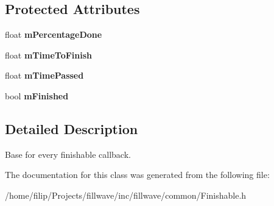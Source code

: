 \subsection*{Protected Attributes}
\begin{DoxyCompactItemize}
\item 
\hypertarget{classfillwave_1_1common_1_1Finishable_a6ff5cf040384c89ca596387efde649a7}{}float {\bfseries m\+Percentage\+Done}\label{classfillwave_1_1common_1_1Finishable_a6ff5cf040384c89ca596387efde649a7}

\item 
\hypertarget{classfillwave_1_1common_1_1Finishable_a3ae8d9913828e82d5762ebe88942c198}{}float {\bfseries m\+Time\+To\+Finish}\label{classfillwave_1_1common_1_1Finishable_a3ae8d9913828e82d5762ebe88942c198}

\item 
\hypertarget{classfillwave_1_1common_1_1Finishable_a7512122b86184a2d4f885816abbbbebc}{}float {\bfseries m\+Time\+Passed}\label{classfillwave_1_1common_1_1Finishable_a7512122b86184a2d4f885816abbbbebc}

\item 
\hypertarget{classfillwave_1_1common_1_1Finishable_ab78ce1f4ef07a832654bca45a9bf2650}{}bool {\bfseries m\+Finished}\label{classfillwave_1_1common_1_1Finishable_ab78ce1f4ef07a832654bca45a9bf2650}

\end{DoxyCompactItemize}


\subsection{Detailed Description}
Base for every finishable callback. 

The documentation for this class was generated from the following file\+:\begin{DoxyCompactItemize}
\item 
/home/filip/\+Projects/fillwave/inc/fillwave/common/Finishable.\+h\end{DoxyCompactItemize}
